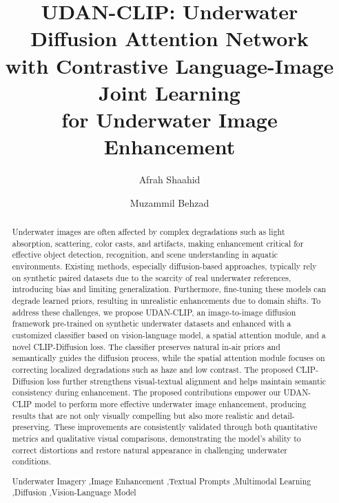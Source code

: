 \documentclass[3p,12pt,authoryear]{elsarticle}
\begin{document}
\begin{frontmatter}

\title{UDAN-CLIP: Underwater Diffusion Attention Network \\with Contrastive Language-Image Joint Learning \\for Underwater Image Enhancement}
\vspace{2em}
\author{Afrah Shaahid}

\author{Muzammil Behzad}


\address{King Fahd University of Petroleum and Minerals, Saudi Arabia}

\vspace{-0.5em}

\begin{abstract}
Underwater images are often affected by complex degradations such as light absorption, scattering, color casts, and artifacts, making enhancement critical for effective object detection, recognition, and scene understanding in aquatic environments. Existing methods, especially diffusion-based approaches, typically rely on synthetic paired datasets due to the scarcity of real underwater references, introducing bias and limiting generalization. Furthermore, fine-tuning these models can degrade learned priors, resulting in unrealistic enhancements due to domain shifts. To address these challenges, we propose UDAN-CLIP, an image-to-image diffusion framework pre-trained on synthetic underwater datasets and enhanced with a customized classifier based on vision-language model, a spatial attention module, and a novel CLIP-Diffusion loss. The classifier preserves natural in-air priors and semantically guides the diffusion process, while the spatial attention module focuses on correcting localized degradations such as haze and low contrast. The proposed CLIP-Diffusion loss further strengthens visual-textual alignment and helps maintain semantic consistency during enhancement. The proposed contributions empower our UDAN-CLIP model to perform more effective underwater image enhancement, producing results that are not only visually compelling but also more realistic and detail-preserving. These improvements are consistently validated through both quantitative metrics and qualitative visual comparisons, demonstrating the model's ability to correct distortions and restore natural appearance in challenging underwater conditions.

\begin{keyword}
Underwater Imagery  \sep Image Enhancement \sep Textual Prompts \sep Multimodal Learning \sep Diffusion  \sep Vision-Language Model
\end{keyword}
    \end{abstract}
  \end{frontmatter}
\end{document}
